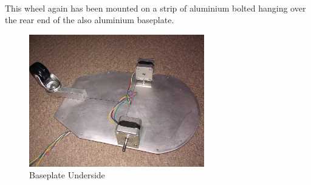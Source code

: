 \\This wheel again has been mounted on a strip of aluminium bolted hanging over the rear end of the also aluminium baseplate.
\begin{figure}[h]
\centering
        \includegraphics[width=3.0in]  {Images/baseplate-underside.jpg}
        \caption{Baseplate Underside}
        \label{Baseplate Underside}
\end{figure}

